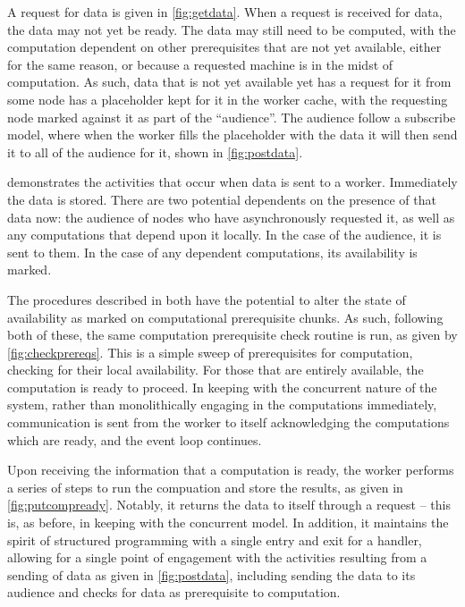 
A request for data is given in \cref{fig:getdata}.
When a request is received for data, the data may not yet be ready.
The data may still need to be computed, with the computation dependent on other prerequisites that are not yet available, either for the same reason, or because a requested machine is in the midst of computation.
As such, data that is not yet available yet has a request for it from some node has a placeholder kept for it in the worker cache, with the requesting node marked against it as part of the ``audience''.
The audience follow a subscribe model, where when the worker fills the placeholder with the data it will then send it to all of the audience for it, shown in \cref{fig:postdata}.


 demonstrates the activities that occur when data is sent to a worker.
Immediately the data is stored.
There are two potential dependents on the presence of that data now: the audience of nodes who have asynchronously requested it, as well as any computations that depend upon it locally.
In the case of the audience, it is sent to them.
In the case of any dependent computations, its availability is marked.


The procedures described in  both have the potential to alter the state of availability as marked on computational prerequisite chunks.
As such, following both of these, the same computation prerequisite check routine is run, as given by \cref{fig:checkprereqs}.
This is a simple sweep of prerequisites for computation, checking for their local availability.
For those that are entirely available, the computation is ready to proceed.
In keeping with the concurrent nature of the system, rather than monolithically engaging in the computations immediately, communication is sent from the worker to itself acknowledging the computations which are ready, and the event loop continues.


Upon receiving the information that a computation is ready, the worker performs a series of steps to run the compuation and store the results, as given in \cref{fig:putcompready}.
Notably, it returns the data to itself through a request -- this is, as before, in keeping with the concurrent model.
In addition, it maintains the spirit of structured programming with a single entry and exit for a handler, allowing for a single point of engagement with the activities resulting from a sending of data as given in \cref{fig:postdata}, including sending the data to its audience and checks for data as prerequisite to computation.

